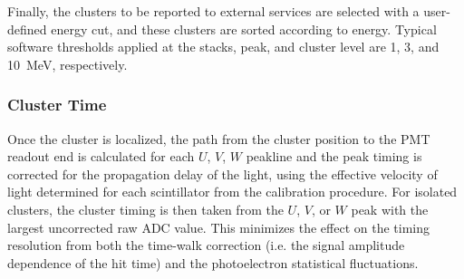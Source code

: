 Finally, the clusters to be reported to external services are selected with a user-defined energy cut, and these
clusters are sorted according to energy. Typical software thresholds applied at the stacks, peak, and cluster level
are 1, 3, and 10~MeV, respectively.

\subsubsection {Cluster Time}
\label{ec-time}

Once the cluster is localized, the path from the cluster position to the PMT readout end is calculated for each
$U$, $V$, $W$ peakline and the peak timing is corrected for the propagation delay of the light, using the effective
velocity of light determined for each scintillator from the calibration procedure. For isolated clusters, the cluster
timing is then taken from the $U$, $V$, or $W$ peak with the largest uncorrected raw ADC value. This minimizes
the effect on the timing resolution from both the time-walk correction (i.e. the signal amplitude dependence of the
hit time) and the photoelectron statistical fluctuations.
